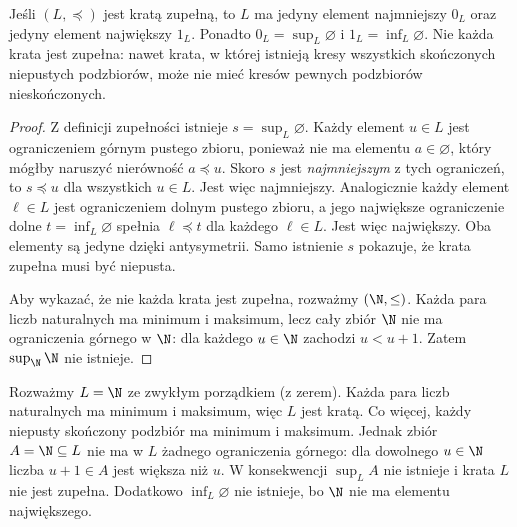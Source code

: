 \begin{twierdzenie}
\label{thm:complete-lattice-bottom-top-xliii}
Jeśli $(L,\preceq)$ jest kratą zupełną, to $L$ ma
jedyny element najmniejszy $0_L$ oraz jedyny element
największy $1_L$. Ponadto
$0_L=\sup_L\varnothing$ i $1_L=\inf_L\varnothing$.
Nie każda krata jest zupełna: nawet krata, w której istnieją
kresy wszystkich skończonych niepustych podzbiorów, może
nie mieć kresów pewnych podzbiorów nieskończonych.
\end{twierdzenie}
\begin{proof}
Z definicji zupełności istnieje $s=\sup_L\varnothing$.
Każdy element $u\in L$ jest ograniczeniem górnym pustego
zbioru, ponieważ nie ma elementu $a\in\varnothing$,
który mógłby naruszyć nierówność $a\preceq u$.
Skoro $s$ jest \emph{najmniejszym} z tych ograniczeń,
to $s\preceq u$ dla wszystkich $u\in L$. Jest więc
najmniejszy. Analogicznie każdy element $\ell\in L$
jest ograniczeniem dolnym pustego zbioru, a jego największe
ograniczenie dolne $t=\inf_L\varnothing$ spełnia
$\ell\preceq t$ dla każdego $\ell\in L$.
Jest więc największy. Oba elementy są jedyne dzięki
antysymetrii. Samo istnienie $s$ pokazuje, że krata
zupełna musi być niepusta.

Aby wykazać, że nie każda krata jest zupełna, rozważmy
$(\N,\le)$. Każda para liczb naturalnych ma minimum
i maksimum, lecz cały zbiór $\N$ nie ma ograniczenia
górnego w $\N$: dla każdego $u\in\N$ zachodzi
$u<u+1$. Zatem $\sup_{\N}\N$ nie istnieje.
\end{proof}
\begin{przyklad}
\label{ex:lattice-not-complete-xliii}
Rozważmy $L=\N$ ze zwykłym porządkiem (z zerem).
Każda para liczb naturalnych ma minimum i maksimum,
więc $L$ jest kratą. Co więcej, każdy niepusty
skończony podzbiór ma minimum i maksimum. Jednak zbiór
$A=\N\subseteq L$ nie ma w $L$ żadnego ograniczenia
górnego: dla dowolnego $u\in\N$ liczba $u+1\in A$
jest większa niż $u$. W konsekwencji $\sup_L A$
nie istnieje i krata $L$ nie jest zupełna.
Dodatkowo $\inf_L\varnothing$ nie istnieje, bo
$\N$ nie ma elementu największego.
\end{przyklad}


